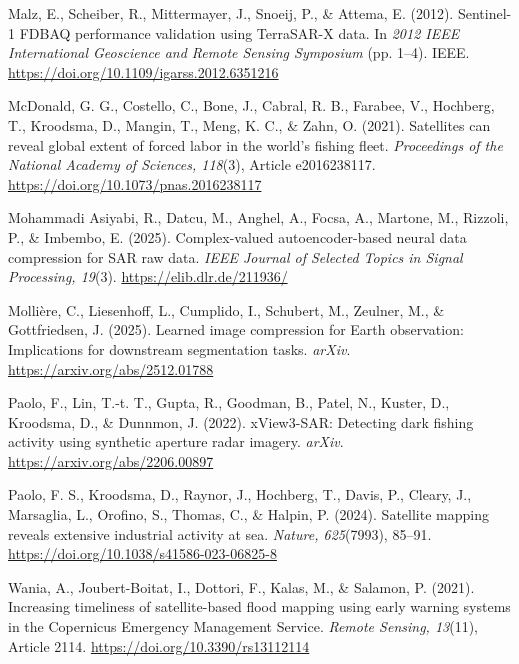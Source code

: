 \documentclass[11pt]{article}
\newcommand{\refentry}[1]{\par\noindent\hangindent=0.4in\hangafter=1 #1\par\medskip}
\begin{document}
\refentry{Malz, E., Scheiber, R., Mittermayer, J., Snoeij, P., \& Attema, E. (2012). Sentinel-1 FDBAQ performance validation using TerraSAR-X data. In \textit{2012 IEEE International Geoscience and Remote Sensing Symposium} (pp. 1--4). IEEE. \url{https://doi.org/10.1109/igarss.2012.6351216}}

\refentry{McDonald, G. G., Costello, C., Bone, J., Cabral, R. B., Farabee, V., Hochberg, T., Kroodsma, D., Mangin, T., Meng, K. C., \& Zahn, O. (2021). Satellites can reveal global extent of forced labor in the world's fishing fleet. \textit{Proceedings of the National Academy of Sciences, 118}(3), Article e2016238117. \url{https://doi.org/10.1073/pnas.2016238117}}

\refentry{Mohammadi Asiyabi, R., Datcu, M., Anghel, A., Focsa, A., Martone, M., Rizzoli, P., \& Imbembo, E. (2025). Complex-valued autoencoder-based neural data compression for SAR raw data. \textit{IEEE Journal of Selected Topics in Signal Processing, 19}(3). \url{https://elib.dlr.de/211936/}}

\refentry{Molli\`ere, C., Liesenhoff, L., Cumplido, I., Schubert, M., Zeulner, M., \& Gottfriedsen, J. (2025). Learned image compression for Earth observation: Implications for downstream segmentation tasks. \textit{arXiv}. \url{https://arxiv.org/abs/2512.01788}}

\refentry{Paolo, F., Lin, T.-t. T., Gupta, R., Goodman, B., Patel, N., Kuster, D., Kroodsma, D., \& Dunnmon, J. (2022). xView3-SAR: Detecting dark fishing activity using synthetic aperture radar imagery. \textit{arXiv}. \url{https://arxiv.org/abs/2206.00897}}

\refentry{Paolo, F. S., Kroodsma, D., Raynor, J., Hochberg, T., Davis, P., Cleary, J., Marsaglia, L., Orofino, S., Thomas, C., \& Halpin, P. (2024). Satellite mapping reveals extensive industrial activity at sea. \textit{Nature, 625}(7993), 85--91. \url{https://doi.org/10.1038/s41586-023-06825-8}}

\refentry{Wania, A., Joubert-Boitat, I., Dottori, F., Kalas, M., \& Salamon, P. (2021). Increasing timeliness of satellite-based flood mapping using early warning systems in the Copernicus Emergency Management Service. \textit{Remote Sensing, 13}(11), Article 2114. \url{https://doi.org/10.3390/rs13112114}}
\end{document}
